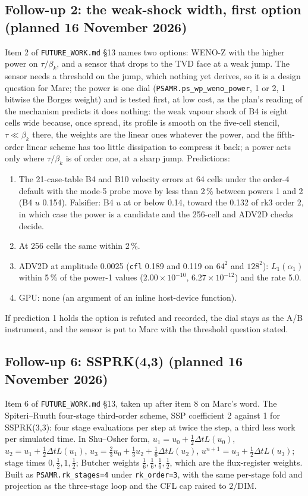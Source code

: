 \documentclass[11pt,a4paper]{article}
\newcommand{\code}[1]{\texttt{\small #1}}
\newcommand{\Dt}{\Delta t}
\begin{document}
\subsection*{Follow-up 2: the weak-shock width, first option (planned 16 November 2026)}

Item 2 of \code{FUTURE\_WORK.md} \S13 names two options: WENO-Z with
the higher power on $\tau/\beta_k$, and a sensor that drops to the TVD
face at a weak jump.  The sensor needs a threshold on the jump, which
nothing yet derives, so it is a design question for Marc; the power is
one dial (\code{PSAMR.ps\_wp\_weno\_power}, 1 or 2, 1 bitwise the
Borges weight) and is tested first, at low cost, as the plan's reading
of the mechanism predicts it does nothing: the weak vapour shock of B4
is eight cells wide because, once spread, its profile is smooth on the
five-cell stencil, $\tau \ll \beta_k$ there, the weights are the linear
ones whatever the power, and the fifth-order linear scheme has too
little dissipation to compress it back; a power acts only where
$\tau/\beta_k$ is of order one, at a sharp jump.  Predictions:
\begin{enumerate}[nosep]
\item The 21-case-table B4 and B10 velocity errors at 64 cells under
      the order-4 default with the mode-5 probe move by less than
      2\,\% between powers 1 and 2 (B4 $u$ 0.154).  Falsifier: B4 $u$
      at or below 0.14, toward the 0.132 of rk3 order 2, in which case
      the power is a candidate and the 256-cell and ADV2D checks decide.
\item At 256 cells the same within 2\,\%.
\item ADV2D at amplitude 0.0025 (\code{cfl} 0.189 and 0.119 on $64^2$
      and $128^2$): $L_1(\alpha_1)$ within 5\,\% of the power-1 values
      ($2.00\times10^{-10}$, $6.27\times10^{-12}$) and the rate 5.0.
\item GPU: none (an argument of an inline host-device function).
\end{enumerate}
If prediction 1 holds the option is refuted and recorded, the dial stays
as the A/B instrument, and the sensor is put to Marc with the threshold
question stated.

\subsection*{Follow-up 6: SSPRK(4,3) (planned 16 November 2026)}

Item 6 of \code{FUTURE\_WORK.md} \S13, taken up after item 8 on
Marc's word.  The Spiteri--Ruuth four-stage third-order scheme, SSP
coefficient 2 against 1 for SSPRK(3,3): four stage evaluations per step
at twice the step, a third less work per simulated time.  In Shu--Osher
form, $u_1 = u_0 + \tfrac12\Dt L(u_0)$, $u_2 = u_1 + \tfrac12\Dt L(u_1)$,
$u_3 = \tfrac23 u_0 + \tfrac13 u_2 + \tfrac16\Dt L(u_2)$,
$u^{n+1} = u_3 + \tfrac12\Dt L(u_3)$; stage times $0, \tfrac12, 1,
\tfrac12$; Butcher weights $\tfrac16, \tfrac16, \tfrac16, \tfrac12$,
which are the flux-register weights.  Built as \code{PSAMR.rk\_stages=4}
under \code{rk\_order=3}, with the same per-stage fold and projection as
the three-stage loop and the CFL cap raised to $2/\mathrm{DIM}$.
\end{document}
